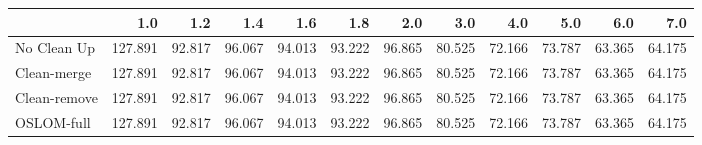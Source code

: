 \begin{tabular}{lrrrrrrrrrrr}
\toprule
{} &     1.0 &    1.2 &    1.4 &    1.6 &    1.8 &    2.0 &    3.0 &    4.0 &    5.0 &    6.0 &    7.0 \\
\midrule
No Clean Up  & 127.891 & 92.817 & 96.067 & 94.013 & 93.222 & 96.865 & 80.525 & 72.166 & 73.787 & 63.365 & 64.175 \\
Clean-merge  & 127.891 & 92.817 & 96.067 & 94.013 & 93.222 & 96.865 & 80.525 & 72.166 & 73.787 & 63.365 & 64.175 \\
Clean-remove & 127.891 & 92.817 & 96.067 & 94.013 & 93.222 & 96.865 & 80.525 & 72.166 & 73.787 & 63.365 & 64.175 \\
OSLOM-full   & 127.891 & 92.817 & 96.067 & 94.013 & 93.222 & 96.865 & 80.525 & 72.166 & 73.787 & 63.365 & 64.175 \\
\bottomrule
\end{tabular}
